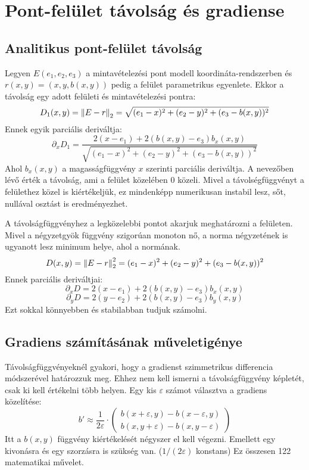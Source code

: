 \section{Pont-felület távolság és gradiense}

\subsection{Analitikus pont-felület távolság}
Legyen $E(e_1,e_2,e_3)$ a mintavételezési pont modell koordináta-rendszerben és $r(x,y) = (x,y,b(x,y))$ pedig a felület parametrikus egyenlete. Ekkor a távolság egy adott felületi és mintavételezési pontra:
$$ D_1(x,y) = \norm{E-r}_2 = \sqrt{(e_1-x)^2 + (e_2-y)^2 + (e_3-b(x,y))^2} $$
Ennek egyik parciális deriváltja: 
$$ \partial_xD_1 = \frac{2(x-e_1) + 2(b(x,y)-e_3)b_x(x,y)}{\sqrt{(e_1-x)^2 + (e_2-y)^2 + (e_3-b(x,y))^2}} $$
Ahol $b_x(x,y)$ a magasságfüggvény $x$ szerinti parciális deriváltja. A nevezőben lévő érték a távolság, ami a felület közelében $0$ közeli. Mivel a távolségfüggvényt a felülethez közel is kiértékeljük, ez mindenképp numerikusan instabil lesz, sőt, nullával osztást is eredményezhet. 

A távolságfüggvényhez a legközelebbi pontot akarjuk meghatározni a felületen. Mivel a négyzetgyök függvény szigorúan monoton nő, a norma négyzetének is ugyanott lesz minimum helye, ahol a normának.
$$ D(x,y) = \norm{E-r}_2^2 = (e_1-x)^2 + (e_2-y)^2 + (e_3-b(x,y))^2 $$
Ennek parciális deriváltjai: 
$$ \partial_xD = 2(x-e_1) + 2(b(x,y)-e_3)b_x(x,y) $$
$$ \partial_yD = 2(y-e_2) + 2(b(x,y)-e_3)b_y(x,y) $$
Ezt sokkal könnyebben és stabilabban tudjuk számolni.

\subsection{Gradiens számításának műveletigénye}
Távolságfüggvényeknél gyakori, hogy a gradienst szimmetrikus differencia módszerével határozzuk meg. Ehhez nem kell ismerni a távolságfüggvény képletét, csak ki kell értékelni több helyen. Egy kis $\varepsilon$ számot választva a gradiens közelítése: 
$$ b' \approx \frac{1}{2\varepsilon} \cdot \begin{pmatrix} b(x+\varepsilon,y) - b(x-\varepsilon,y) \\ b(x,y+\varepsilon) - b(x,y-\varepsilon) \end{pmatrix} $$
Itt a $b(x,y)$ függvény kiértékelését négyszer el kell végezni. Emellett egy kivonásra és egy szorzásra is szükség van. ($1/(2\varepsilon)$ konstans) Ez összesen 122 matematikai művelet. 

